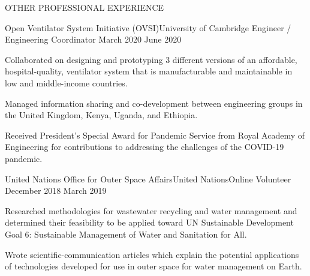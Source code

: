 \documentclass{resume} %
\begin{document}
\begin{rSection}{OTHER PROFESSIONAL EXPERIENCE }

\begin{rSubsection} {Open Ventilator System Initiative (OVSI)}{University of Cambridge}
 {Engineer / Engineering Coordinator }{March 2020 {\textendash} June 2020}
\item Collaborated on designing and prototyping 3 different versions of an affordable, hospital-quality, ventilator system that is manufacturable and maintainable in low and middle-income countries.
\item Managed information sharing and co-development between engineering groups in the United Kingdom, Kenya, Uganda, and Ethiopia.
\item Received President’s Special Award for Pandemic Service from Royal Academy of Engineering  for contributions to addressing the challenges of the COVID-19 pandemic. 
\end{rSubsection}

\begin{rSubsection}
{United Nations Office for Outer Space Affairs}{United Nations}{Online Volunteer}{	 December 2018 {\textendash} March 2019}

 \item Researched methodologies for wastewater recycling and water management and determined their feasibility to be applied toward UN Sustainable Development Goal 6: Sustainable Management of Water and Sanitation for All.
 
\item   Wrote scientific-communication articles which explain the potential applications of technologies developed for use in outer space for water management on Earth.
\end{rSubsection}



\end{rSection}
\end{document}
